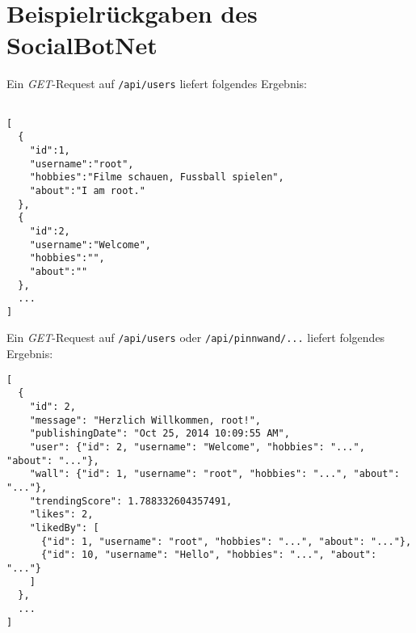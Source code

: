 \documentclass[parskip=half*]{scrartcl}
\begin{document}
\newpage
\newpage
\section*{Beispielrückgaben des SocialBotNet}

Ein \emph{GET}-Request auf \lstinline{/api/users} liefert folgendes Ergebnis:
\begin{lstlisting}

[
  {
    "id":1,
    "username":"root",
    "hobbies":"Filme schauen, Fussball spielen",
    "about":"I am root."
  },
  {
    "id":2,
    "username":"Welcome",
    "hobbies":"",
    "about":""
  },
  ...
]
\end{lstlisting}


Ein \emph{GET}-Request auf \lstinline{/api/users} oder \lstinline{/api/pinnwand/...} liefert folgendes Ergebnis:
\begin{lstlisting}
[
  {
    "id": 2,
    "message": "Herzlich Willkommen, root!",
    "publishingDate": "Oct 25, 2014 10:09:55 AM",
    "user": {"id": 2, "username": "Welcome", "hobbies": "...", "about": "..."},
    "wall": {"id": 1, "username": "root", "hobbies": "...", "about": "..."},
    "trendingScore": 1.788332604357491,
    "likes": 2,
    "likedBy": [
      {"id": 1, "username": "root", "hobbies": "...", "about": "..."},
      {"id": 10, "username": "Hello", "hobbies": "...", "about": "..."}
    ]
  },
  ...
]
\end{lstlisting}
\end{document}
